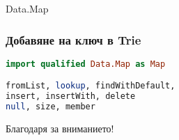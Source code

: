 \documentclass{beamer}
\begin{document}
\begin{frame}[fragile]
\begin{columns}[t]
\begin{column}{0.80\textwidth}
  \end{column}
\end{columns}

\end{frame}


\begin{frame}
  \centerline{Data.Map}
\end{frame}

\begin{frame}[fragile]
  \frametitle{Добавяне на ключ в Trie}
\begin{lstlisting}[basicstyle=\small,language=Haskell]
import qualified Data.Map as Map

fromList, lookup, findWithDefault, 
insert, insertWith, delete
null, size, member
\end{lstlisting}
\end{frame}

\begin{frame}
  \centerline{Благодаря за вниманието!}
\end{frame}
\end{document}
